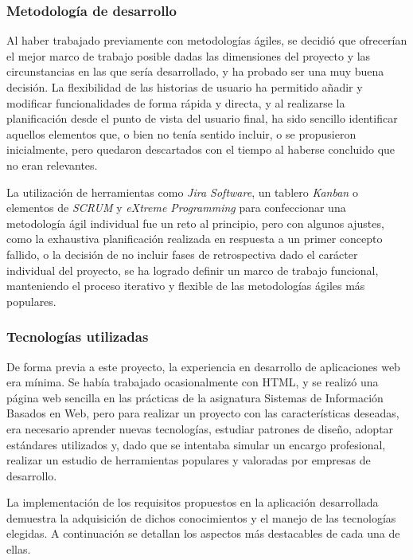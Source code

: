 \documentclass[10pt, a4paper]{aqademic}
\begin{document}
\subsubsection*{Metodología de desarrollo}

Al haber trabajado previamente con metodologías ágiles, se decidió que ofrecerían el mejor marco de trabajo posible dadas las dimensiones del proyecto y las circunstancias en las que sería desarrollado, y ha probado ser una muy buena decisión. La flexibilidad de las historias de usuario ha permitido añadir y modificar funcionalidades de forma rápida y directa, y al realizarse la planificación desde el punto de vista del usuario final, ha sido sencillo identificar aquellos elementos que, o bien no tenía sentido incluir, o se propusieron inicialmente, pero quedaron descartados con el tiempo al haberse concluido que no eran relevantes.

La utilización de herramientas como \textit{Jira Software}, un tablero \textit{Kanban} o elementos de \textit{SCRUM} y \textit{eXtreme Programming} para confeccionar una metodología ágil individual fue un reto al principio, pero con algunos ajustes, como la exhaustiva planificación realizada en respuesta a un primer concepto fallido, o la decisión de no incluir fases de retrospectiva dado el carácter individual del proyecto, se ha logrado definir un marco de trabajo funcional, manteniendo el proceso iterativo y flexible de las metodologías ágiles más populares.


\subsubsection{Tecnologías utilizadas}

De forma previa a este proyecto, la experiencia en desarrollo de aplicaciones web era mínima. Se había trabajado ocasionalmente con HTML, y se realizó una página web sencilla en las prácticas de la asignatura Sistemas de Información Basados en Web, pero para realizar un proyecto con las características deseadas, era necesario aprender nuevas tecnologías, estudiar patrones de diseño, adoptar estándares utilizados y, dado que se intentaba simular un encargo profesional, realizar un estudio de herramientas populares y valoradas por empresas de desarrollo. 

La implementación de los requisitos propuestos en la aplicación desarrollada demuestra la adquisición de dichos conocimientos y el manejo de las tecnologías elegidas. A continuación se detallan los aspectos más destacables de cada una de ellas.
\end{document}
